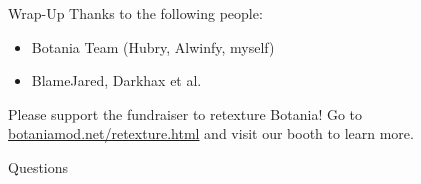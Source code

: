 \documentclass{beamer}
\begin{document}
\begin{frame}{Wrap-Up}
  Thanks to the following people:
  \begin{itemize}
  \item Botania Team (Hubry, Alwinfy, myself)
  \item BlameJared, Darkhax et al.
  \end{itemize}

  Please support the fundraiser to retexture Botania!
  Go to \href{https://botaniamod.net/retexture.html}{botaniamod.net/retexture.html} and visit our booth to learn more.
\end{frame}

\begin{frame}
  Questions
\end{frame}
\end{document}
